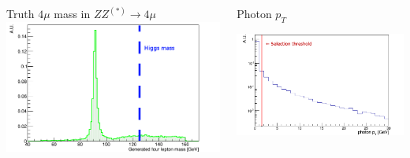 \documentclass{beamer}
\begin{document}
\begin{frame}[t]
\begin{columns}
\begin{column}{.5\textwidth}
\centering
Truth $4\mu$ mass in $ZZ^{(*)} \rightarrow 4\mu$
\includegraphics[width=\textwidth]{ZZ4mu/gen4muMass4}
\end{column}
\begin{column}{.5\textwidth}
\centering
Photon $p_{T}$\par
\includegraphics[width=\textwidth]{HZZ4mu/photonPt4}
\end{column}
\end{columns}
\end{frame}

\end{document}
